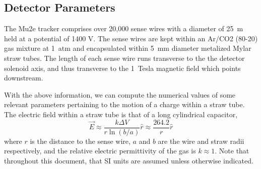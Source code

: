\documentclass[twoside]{article}
\begin{document}
\begin{multicols}{2}







\section{Detector Parameters}


The Mu2e tracker comprises over 20,000 sense wires with a diameter of 25~\textmu m held at a potential of 1400 V. The sense wires are kept within an Ar/CO2 (80-20) gas mixture at 1~atm and encapsulated within 5~mm diameter metalized Mylar straw tubes. The length of each sense wire runs transverse to the the detector solenoid axis, and thus transverse to the 1~Tesla magnetic field which points downstream\cite{tdr}.

With the above information, we can compute the numerical values of some relevant parameters pertaining to the motion of a charge within a straw tube.  The electric field within a straw tube is that of a long cylindrical capacitor,
\begin{equation}
\label{eq:E}
\vec{E} \approx \frac{ k \Delta V}{r \ln(b/a)} \hat{r} \approx \frac{264.2}{r} \hat{r}
\end{equation}
where $r$ is the distance to the sense wire, $a$ and $b$ are the wire and straw radii respectively, and the relative electric permittivity of the gas is $k \approx 1$. Note that throughout this document, that SI units are assumed unless otherwise indicated. 


\end{multicols}
\end{document}
